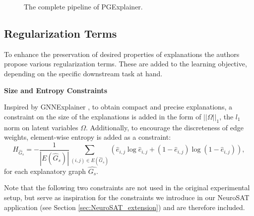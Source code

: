 \begin{figure}
\caption[Pipeline of PGExplainer]{The complete pipeline of PGExplainer.}
\label{fig:PGExplainer_pipeline}
\end{figure}

\subsection{Regularization Terms}
\label{sec:Regularization_Terms}
To enhance the preservation of desired properties of explanations the authors propose various regularization terms. These are added to the learning objective, depending on the specific downstream task at hand.\bigskip

\textbf{Size and Entropy Constraints}\par
Inspired by GNNExplainer \cite{ying2019gnnexplainer}, to obtain compact and precise explanations, a constraint on the size of the explanations is added in the form of $||\Omega||_1$, the $l_1$ norm on latent variables $\Omega$. Additionally, to encourage the discreteness of edge weights, element-wise entropy is added as a constraint:
\begin{equation}
    H_{\hat{G}_s} = -\frac{1}{|E(\hat{G}_s)|}\sum_{(i,j)\in E(\hat{G}_s)} (\hat{e}_{i,j}\log \hat{e}_{i,j} + (1-\hat{e}_{i,j})\log(1-\hat{e}_{i,j})),
\end{equation}
for each explanatory graph $\hat{G_s}$. \bigskip

Note that the following two constraints are not used in the original experimental setup, but serve as inspiration for the constraints we introduce in our NeuroSAT application (see Section \ref{sec:NeuroSAT_extension}) and are therefore included. \bigskip

